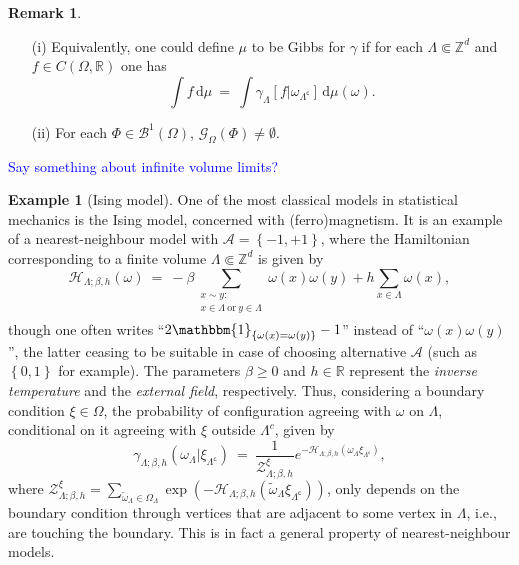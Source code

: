 \documentclass[12pt]{article}
\newcommand{\A}{\mathcal{A}}
\newcommand{\BB}{\mathscr{B}}
\renewcommand{\d}{\mathrm{d}}
\newcommand{\G}{\mathcal{G}}
\renewcommand{\H}{\mathcal{H}}
\newcommand{\R}{\mathbb{R}}
\newcommand{\Z}{\mathbb{Z}}
\newcommand{\ZZ}{\mathcal{Z}}
\newcommand{\set}[1]{\left\{#1\right\}}
\newcommand{\1}{\mathbbm{1}}
\renewcommand{\c}{\mathsf{c}}
\newcommand{\5}{\vspace{0.5cm}}
\renewcommand{\tilde}{\widetilde}
\theoremstyle{definition}
\newtheorem{ex}[thm]{Example}
\newtheorem{rem}[thm]{Remark}
\begin{document}
\begin{rem}
~
\begin{itemize}
	\item[(i)] Equivalently, one could define $\mu$ to be Gibbs for $\gamma$ if for each $\Lambda\Subset\Z^d$ and $f\in C(\Omega,\R)$ one has
	$$\int f\,\d\mu ~=~ \int\gamma_\Lambda[f|\omega_{\Lambda^\c}]\,\d\mu(\omega).$$
	\item[(ii)] For each $\Phi\in\BB^1(\Omega)$, $\G_\Omega(\Phi)\neq\emptyset$.
\end{itemize}
\end{rem}

\noindent\textcolor{blue}{Say something about infinite volume limits?}

\begin{ex}[Ising model]
One of the most classical models in statistical mechanics is the Ising model, concerned with (ferro)magnetism. It is an example of a nearest-neighbour model with $\A=\set{-1,+1}$, where the Hamiltonian corresponding to a finite volume $\Lambda\Subset\Z^d$ is given by
$$\H_{\Lambda;\beta,h}(\omega) ~=~ -\beta\!\!\!\!\!\!\!\sum_{\substack{x\sim y:\\x\in\Lambda~\text{or}~y\in\Lambda\\}}\!\!\!\!\!\!\!\omega(x)\omega(y) + h\sum_{x\in\Lambda}\omega(x),$$
though one often writes ``$2\1_{\set{\omega(x)=\omega(y)}}-1$'' instead of ``$\omega(x)\omega(y)$'', the latter ceasing to be suitable in case of choosing alternative $\A$ (such as $\set{0,1}$ for example). The parameters $\beta\geq 0$ and $h\in\R$ represent the \textit{inverse temperature} and the \textit{external field}, respectively. Thus, considering a boundary condition $\xi\in\Omega$, the probability of configuration agreeing with $\omega$ on $\Lambda$, conditional on it agreeing with $\xi$ outside $\Lambda^c$, given by
$$\gamma_{\Lambda;\beta,h}(\omega_\Lambda|\xi_{\Lambda^\c}) ~=~ \frac{1}{\ZZ_{\Lambda;\beta,h}^\xi}e^{-\H_{\Lambda;\beta,h}(\omega_\Lambda\xi_{\Lambda^\c})},$$
where $\ZZ_{\Lambda;\beta,h}^\xi=\sum_{\tilde{\omega}_\Lambda\in\Omega_\Lambda}\exp(-\H_{\Lambda;\beta,h}(\tilde{\omega}_\Lambda\xi_{\Lambda^\c}))$, only depends on the boundary condition through vertices that are adjacent to some vertex in $\Lambda$, i.e., are touching the boundary. This is in fact a general property of nearest-neighbour models.
\end{ex}
\end{document}
